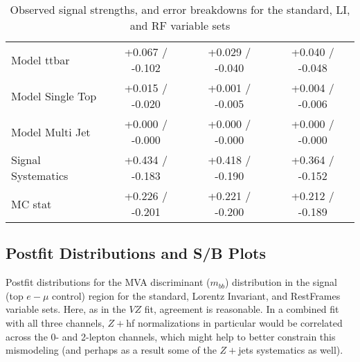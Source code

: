 \begin{enumeate}
\begin{table}[!htbp]
\begin{center}
\begin{tabular}{lccc}
Model ttbar &  +0.067 / -0.102  &  +0.029 / -0.040  &  +0.040 / -0.048 \\
Model Single Top &  +0.015 / -0.020  &  +0.001 / -0.005  &  +0.004 / -0.006 \\
Model Multi Jet &  +0.000 / -0.000  &  +0.000 / -0.000  &  +0.000 / -0.000 \\
Signal Systematics &  +0.434 / -0.183  &  +0.418 / -0.190  &  +0.364 / -0.152 \\
MC stat &  +0.226 / -0.201  &  +0.221 / -0.200  &  +0.212 / -0.189 \\
\hline\hline
\end{tabular}
\end{center}
\caption{Observed signal strengths, and error breakdowns for the standard, LI, and RF variable sets}
\label{tab:breakdownobs}
\end{table}
\clearpage

\subsection{Postfit Distributions and S/B Plots}
Postfit distributions for the MVA discriminant ($m_{bb}$) distribution in the signal (top $e-\mu$ control) region for the standard, Lorentz Invariant, and RestFrames variable sets.  Here, as in the $VZ$ fit, agreement is reasonable.  In a combined fit with all three channels, $Z+$hf normalizations in particular would be correlated across the 0- and 2-lepton channels, which might help to better constrain this mismodeling (and perhaps as a result some of the $Z+$jets systematics as well).


\end{enumeate}
